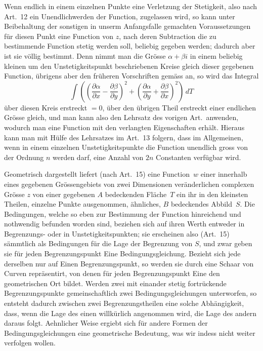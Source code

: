 \documentclass[a4paper,12pt]{article}
\begin{document}
Wenn endlich in einem einzelnen Punkte eine Verletzung der
Stetigkeit, also nach Art.~12 ein Unendlichwerden der Function,
zugelassen wird, so kann unter Beibehaltung der sonstigen in
unserm Anfangsfalle gemachten Voraussetzungen f\"{u}r diesen
Punkt eine Function von $z$, nach deren Subtraction die zu
bestimmende Function stetig werden soll, beliebig gegeben werden;
dadurch aber ist sie v\"{o}llig bestimmt.  Denn nimmt man die
Gr\"{o}sse $\alpha + \beta i$ in einem beliebig kleinen um den
Unstetigkeitspunkt beschriebenen Kreise gleich dieser gegebenen
Function, \"{u}brigens aber den fr\"{u}heren Vorschriften
gem\"{a}ss an, so wird das Integral
\[ \int
      \left(
         \left(
            \frac{\partial \alpha}{\partial x}
          - \frac{\partial \beta }{\partial y}
         \right)^2
       + \left(
            \frac{\partial \alpha}{\partial y}
          + \frac{\partial \beta }{\partial x}
         \right)^2
      \right) \, dT \]
\"{u}ber diesen Kreis erstreckt $= 0$, \"{u}ber den \"{u}brigen
Theil erstreckt einer endlichen Gr\"{o}sse gleich, und man kann
also den Lehrsatz des vorigen Art.\ anwenden, wodurch man eine
Function mit den verlangten Eigenschaften erh\"{a}lt.  Hieraus
kann man mit H\"{u}lfe des Lehrsatzes im Art.~13 folgern, dass im
Allgemeinen, wenn in einem einzelnen Unstetigkeitspunkte
die Function unendlich gross von der Ordnung $n$ werden darf,
eine Anzahl von $2n$ Constanten verf\"{u}gbar wird.

Geometrisch dargestellt liefert (nach Art.~15) eine Function~$w$
einer innerhalb eines gegebenen Gr\"{o}ssengebiets von zwei
Dimensionen ver\"{a}nderlichen complexen Gr\"{o}sse $z$ von einer
gegebenen $A$ bedeckenden Fl\"{a}che~$T$ ein ihr in den kleinsten
Theilen, einzelne Punkte ausgenommen, \"{a}hnliches, $B$
bedeckendes Abbild~$S$.  Die Bedingungen, welche so eben zur
Bestimmung der Function hinreichend und nothwendig befunden
worden sind, beziehen sich auf ihren Werth entweder in
Begrenzungs- oder in Unstetigkeitspunkten; sie erscheinen also
(Art.~15) s\"{a}mmtlich als Bedingungen f\"{u}r die Lage der
Begrenzung von $S$, und zwar geben sie f\"{u}r jeden
Begrenzungspunkt Eine Bedingungsgleichung.  Bezieht sich jede
derselben nur auf Einen Begrenzungspunkt, so werden sie durch
eine Schaar von Curven repr\"{a}sentirt, von denen f\"{u}r jeden
Begrenzungspunkt Eine den geometrischen Ort bildet.  Werden zwei
mit einander stetig fortr\"{u}ckende Begrenzungspunkte
gemeinschaftlich zwei Bedingungsgleichungen unterworfen, so
entsteht dadurch zwischen zwei Begrenzungstheilen eine solche
Abh\"{a}ngigkeit, dass, wenn die Lage des einen willk\"{u}rlich
angenommen wird, die Lage des andern daraus folgt.  Aehnlicher
Weise ergiebt sich f\"{u}r andere Formen der
Bedingungsgleichungen eine geometrische Bedeutung, was wir indess
nicht weiter verfolgen wollen.
\end{document}
